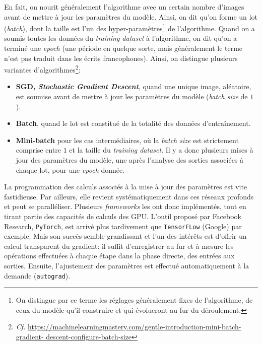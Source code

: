 \documentclass[a4paper,11pt]{article} %
\newcommand{\ttt}[1]{\texttt{#1}}
\begin{document}
En fait, on \og nourit \og généralement l'algorithme avec un certain nombre d'images avant de mettre à jour les paramètres du modèle. Ainsi, on dit qu'on forme un lot (\emph{batch}), dont la taille est l'un des hyper-paramètres\footnote{On distingue par ce terme les réglages généralement fixes de l'algorithme, de ceux du modèle qu'il construire et qui évolueront au fur du déroulement.} de l'algorithme. Quand on a soumis toutes les données du \emph{training dataset} à l'algorithme, on dit qu'on a terminé une \emph{epoch} (une période en quelque sorte, mais généralement le terme n'est pas traduit dans les écrits francophones). Ainsi, on distingue plusieurs variantes d'algorithmes\footnote{\emph{Cf.} \href{https://machinelearningmastery.com/gentle-introduction-mini-batch-gradient-descent-configure-batch-size/}{https://machinelearningmastery.com/gentle-introduction-mini-batch-gradient- descent-configure-batch-size}}:
\begin{itemize}
    \item
    \textbf{SGD, \emph{Stochastic Gradient Descent}}, quand une unique image, aléatoire, est soumise avant de mettre à jour les paramètres du modèle (\emph{batch size} de $1$).
    \item
    \textbf{Batch}, quand le lot est constitué de la totalité des données d'entraînement.
    \item
    \textbf{Mini-batch} pour les cas intermédiaires, où la \emph{batch size} est strictement comprise entre $1$ et la taille du \emph{training dataset}. Il y a donc plusieurs mises à jour des paramètres du modèle, une après l'analyse des sorties associées à chaque lot, pour une \emph{epoch} donnée.
\end{itemize}

La programmation des calculs associés à la mise à jour des paramètres est vite fastidieuse. Par ailleurs, elle revient systématiquement dans ces réseaux profonds et peut se paralléliser. Plusieurs \emph{frameworks} les ont donc implémentés, tout en tirant partie des capacités de calculs des GPU. L'outil proposé par Facebook Research, \ttt{PyTorch}, est arrivé plus tardivement que \ttt{TensorFLow}  (Google) par exemple. Mais son succès semble grandissant et l'un des intérêts est d'offrir un calcul transparent du gradient: il suffit d'enregistrer au fur et à mesure les opérations effectuées à chaque étape dans la phase directe, des entrées aux sorties. Ensuite, l'ajustement des paramètres est effectué automatiquement à la demande (\ttt{autograd}).
\end{document}
